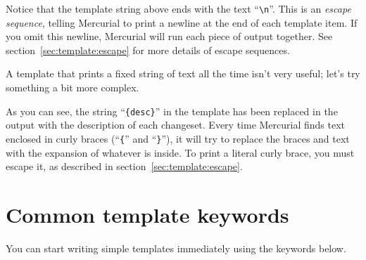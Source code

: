 Notice that the template string above ends with the text
``\Verb+\n+''.  This is an \emph{escape sequence}, telling Mercurial
to print a newline at the end of each template item.  If you omit this
newline, Mercurial will run each piece of output together.  See
section~\ref{sec:template:escape} for more details of escape sequences.

A template that prints a fixed string of text all the time isn't very
useful; let's try something a bit more complex.


As you can see, the string ``\Verb+{desc}+'' in the template has been
replaced in the output with the description of each changeset.  Every
time Mercurial finds text enclosed in curly braces (``\texttt{\{}''
and ``\texttt{\}}''), it will try to replace the braces and text with
the expansion of whatever is inside.  To print a literal curly brace,
you must escape it, as described in section~\ref{sec:template:escape}.

\section{Common template keywords}
\label{sec:template:keyword}

You can start writing simple templates immediately using the keywords
below.

